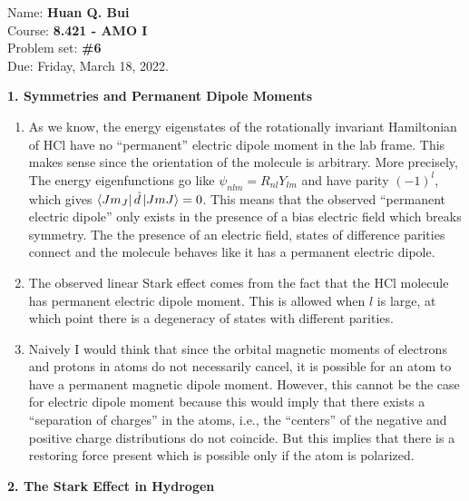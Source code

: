 \documentclass{article}
\theoremstyle{definition}
\begin{document}
\begin{framed}
\noindent Name: \textbf{Huan Q. Bui}\\
Course: \textbf{8.421 - AMO I}\\
Problem set: \textbf{\#6}\\
Due: Friday, March 18, 2022.
\end{framed}
	
\noindent \textbf{1. Symmetries and Permanent Dipole Moments}

\begin{enumerate}[label=(\alph*)]
	\item As we know, the energy eigenstates of the rotationally invariant Hamiltonian of HCl have no ``permanent'' electric dipole moment in the lab frame. This makes sense since the orientation of the molecule is arbitrary. More precisely, The energy eigenfunctions go like $\psi_{nlm} = R_{nl}Y_{lm}$ and have parity $(-1)^l$, which gives $\bra{Jm_J} \hat{d} \ket{JmJ}= 0$.  This means that the observed ``permanent electric dipole'' only exists in the presence of a bias electric field which breaks symmetry. The the presence of an electric field, states of difference parities connect and the molecule behaves like it has a permanent electric dipole.
	
	\item  The observed linear Stark effect comes from the fact that the HCl molecule has permanent electric dipole moment. This is allowed when $l$ is large, at which point there is a degeneracy of states with different parities. 
	
	\item Naively I would think that since the orbital magnetic moments of electrons and protons in atoms do not necessarily cancel, it is possible for an atom to have a permanent magnetic dipole moment. However, this cannot be the case for electric dipole moment because this would imply that there exists a ``separation of charges'' in the atoms, i.e., the ``centers'' of the negative and positive charge distributions do not coincide. But this implies that there is a restoring force present which is possible only if the atom is polarized. 
\end{enumerate}

\noindent \textbf{2. The Stark Effect in Hydrogen}
\end{document}
